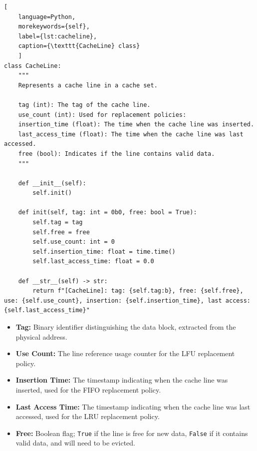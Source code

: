 \begin{center}
\centering
\begin{minipage}{\linewidth}
\begin{lstlisting}[
    language=Python,
	morekeywords={self},
    label={lst:cacheline},
    caption={\texttt{CacheLine} class}
    ]
class CacheLine:
    """
    Represents a cache line in a cache set.

    tag (int): The tag of the cache line.
    use_count (int): Used for replacement policies:
    insertion_time (float): The time when the cache line was inserted.
    last_access_time (float): The time when the cache line was last accessed.
    free (bool): Indicates if the line contains valid data.
    """

    def __init__(self):
        self.init()

    def init(self, tag: int = 0b0, free: bool = True):
        self.tag = tag
        self.free = free
        self.use_count: int = 0
        self.insertion_time: float = time.time()
        self.last_access_time: float = 0.0

    def __str__(self) -> str:
        return f"[CacheLine]: tag: {self.tag:b}, free: {self.free}, use: {self.use_count}, insertion: {self.insertion_time}, last access: {self.last_access_time}"
\end{lstlisting}
\end{minipage}
\end{center}

\noindent
\begin{itemize}
    \item \textbf{Tag:} Binary identifier distinguishing the data block, extracted from the physical address.
    \item \textbf{Use Count:} The line reference usage counter for the LFU replacement policy.
    \item \textbf{Insertion Time:} The timestamp indicating when the cache line was inserted, used for the FIFO replacement policy.
    \item \textbf{Last Access Time:} The timestamp indicating when the cache line was last accessed, used for the LRU replacement policy.
    \item \textbf{Free:} Boolean flag; \texttt{True} if the line is free for new data, \texttt{False} if it contains valid data, and will need to be evicted.
\end{itemize}


